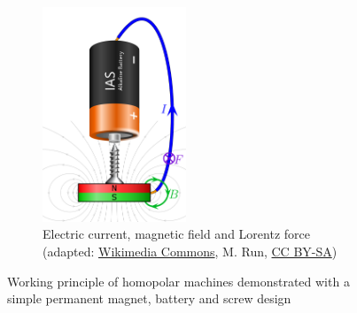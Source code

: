 \begin{frame}
\begin{figure}
\begin{subfigure}[b]{0.49\textwidth}
			\centering
			\includegraphics[width=0.47\textwidth]{fig/lec03/Homopolar_machine.pdf}
			\caption{Electric current, magnetic field and Lorentz force (adapted: \href{https://commons.wikimedia.org/wiki/File:Homopolar-motor.svg}{Wikimedia Commons}, M. Run, \href{https://creativecommons.org/licenses/by-sa/4.0/deed.en}{CC BY-SA})}
		\end{subfigure}
		\caption{Working principle of homopolar machines demonstrated with a simple permanent magnet, battery and screw design} 
        \label{fig:Homopolar_machine}
	\end{figure}
\end{frame}


